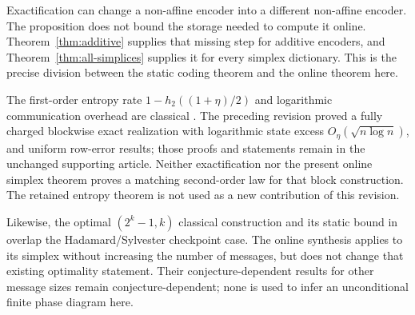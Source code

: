 Exactification can change a non-affine encoder into a different
non-affine encoder. The proposition does not bound the storage needed
to compute it online. Theorem~\ref{thm:additive} supplies that missing
step for additive encoders, and Theorem~\ref{thm:all-simplices} supplies
it for every simplex dictionary. This is the precise division between
the static coding theorem and the online theorem here.

The first-order entropy rate $1-h_2((1+\eta)/2)$ and logarithmic
communication overhead are classical \cite{ANTV}. The preceding revision
proved a fully charged blockwise exact realization with logarithmic
state excess $O_\eta(\sqrt{n\log n})$, and uniform row-error results;
those proofs and statements remain in the unchanged supporting article.
Neither exactification nor the present online simplex theorem proves a
matching second-order law for that block construction. The retained
entropy theorem is not used as a new contribution of this revision.

Likewise, the optimal $(2^k-1,k)$ classical construction and its static
bound in \cite[Theorems 16--17]{Kondo2026} overlap the Hadamard/Sylvester
checkpoint case. The online synthesis applies to its simplex without
increasing the number of messages, but does not change that existing
optimality statement. Their conjecture-dependent results for other
message sizes remain conjecture-dependent; none is used to infer an
unconditional finite phase diagram here.
